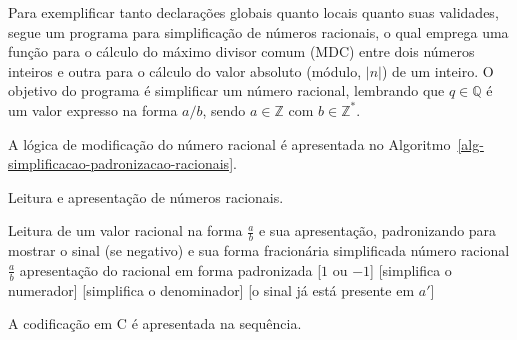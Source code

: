 \documentclass[
  11pt,
  a4paper,
]{scrbook}
\begin{document}
Para exemplificar tanto declarações globais quanto locais quanto suas
validades, segue um programa para simplificação de números racionais, o
qual emprega uma função para o cálculo do máximo divisor comum (MDC)
entre dois números inteiros e outra para o cálculo do valor absoluto
(módulo, \(\lvert n\rvert\)) de um inteiro. O objetivo do programa é
simplificar um número racional, lembrando que \(q \in \mathbb{Q}\) é um
valor expresso na forma \(a/b\), sendo \(a \in \mathbb{Z}\) com
\(b \in \mathbb{Z}^*\).

A lógica de modificação do número racional é apresentada no
Algoritmo~\ref{alg-simplificacao-padronizacao-racionais}.

\begin{algorithm}[H]
\caption{\label{alg-simplificacao-padronizacao-racionais}Leitura e
apresentação de números racionais.}
\begingroup%


\begin{algorithmic}
    \Description Leitura de um valor racional na forma $\frac{a}{b}$ e sua apresentação, padronizando para mostrar o sinal (se negativo) e sua forma fracionária simplificada
    \Require número racional $\frac{a}{b}$
    \Ensure apresentação do racional em forma padronizada
    \Statex{}
    [$1$ ou $-1$]
    [simplifica o numerador]
    [simplifica o denominador]
    [o sinal já está presente em $a'$]
\end{algorithmic}

\endgroup
\end{algorithm}

A codificação em C é apresentada na sequência.
\end{document}
